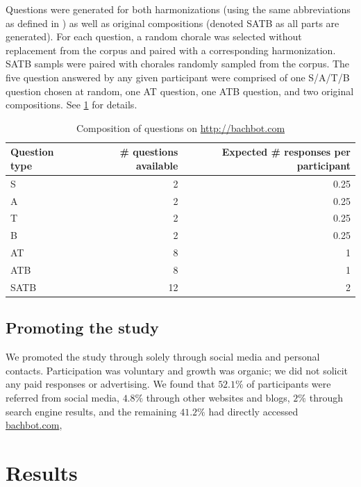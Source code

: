 Questions were generated for both harmonizations (using the same abbreviations
as defined in ) as well as original compositions (denoted SATB as all parts
are generated). For each question, a random chorale was selected without
replacement from the corpus and paired with a corresponding harmonization.
SATB sampls were paired with chorales randomly sampled from the corpus. The
five question answered by any given participant were comprised of one S/A/T/B
question chosen at random, one AT question, one ATB question, and two original
compositions. See \cref{tab:bachbot-com-question-distribtion} for details.

\begin{table}[tb]
  \centering
  \begin{tabular}{lrr}
    \toprule
    Question type & \# questions available & Expected \# responses per participant \\
    \midrule
    S        & 2  & 0.25 \\
    A        & 2  & 0.25 \\
    T        & 2  & 0.25 \\
    B        & 2  & 0.25 \\
    AT       & 8  & 1 \\
    ATB      & 8  & 1 \\
    SATB     & 12 & 2 \\
    \bottomrule
  \end{tabular}
  \caption{Composition of questions on \url{http://bachbot.com}}
  \label{tab:bachbot-com-question-distribtion}
\end{table}

\subsection{Promoting the study}

We promoted the study through solely through social media and personal
contacts. Participation was voluntary and growth was organic; we did not
solicit any paid responses or advertising. We found that $52.1\%$
of participants were referred from social media, $4.8\%$ through other websites
and blogs, $2\%$ through search engine results, and the remaining $41.2\%$ had
directly accessed \url{bachbot.com},

\section{Results}\label{sec:eval-results}

